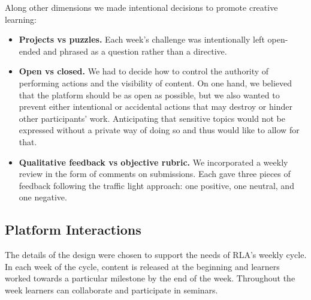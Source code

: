 \documentclass[12pt,twoside,vi]{mitthesis}
\begin{document}
{Along other dimensions we made intentional decisions to promote creative learning:
\begin{itemize}
\item \textbf{Projects vs puzzles.} Each week's challenge was intentionally left open-ended and phrased as a question rather than a directive. 
\item \textbf{Open vs closed.} We had to decide how to control the authority of performing actions and the visibility of content. On one hand, we believed that the platform should be as open as possible, but we also wanted to prevent either intentional or accidental actions that may destroy or hinder other participants' work. Anticipating that sensitive topics would not be expressed without a private way of doing so and thus would like to allow for that.
\item \textbf{Qualitative feedback vs objective rubric.} We incorporated a weekly review in the form of comments on submissions. Each gave three pieces of feedback following the traffic light approach: one positive, one neutral, and one negative.
\end{itemize}
}

\subsection{Platform Interactions}

The details of the design were chosen to support the needs of RLA's weekly cycle. In each week of the cycle, content is released at the beginning and learners worked towards a particular milestone by the end of the week. Throughout the week learners can collaborate and participate in seminars.
\end{document}
